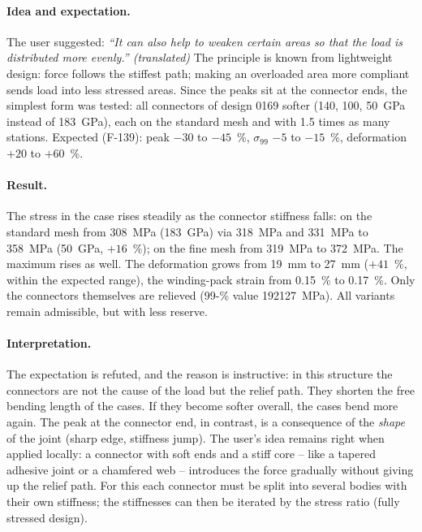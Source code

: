 \paragraph{Idea and expectation.} The user suggested: \emph{“It can also help to weaken certain areas so that the load
is distributed more evenly.” (translated)} The principle is known from lightweight design: force follows the stiffest
path; making an overloaded area more compliant sends load into less stressed areas. Since the peaks sit at the connector
ends, the simplest form was tested: all connectors of design 0169 softer (\SI{140}{}, \SI{100}{}, \SI{50}{GPa} instead
of \SI{183}{GPa}), each on the standard mesh and with 1.5 times as many stations. Expected (F-139): peak $-30$ to
$-45$~\%, $\sigma_{99}$ $-5$ to $-15$~\%, deformation $+20$ to $+60$~\%.

\begin{table}[H]\centering\scriptsize\caption{0169 with softer connectors. Numbers: 1xx
standard mesh, 2xx 1.5 times as many stations; original \SI{183}{GPa}: \SI{308}{MPa} and \SI{319}{MPa}.}\end{table}

\paragraph{Result.} The stress in the case rises steadily as the connector stiffness falls: on the standard mesh from
\SI{308}{MPa} (\SI{183}{GPa}) via \SI{318}{MPa} and \SI{331}{MPa} to \SI{358}{MPa} (\SI{50}{GPa}, $+16$~\%); on the fine
mesh from \SI{319}{MPa} to \SI{372}{MPa}. The maximum rises as well. The deformation grows from \SI{19}{mm} to
\SI{27}{mm} ($+41$~\%, within the expected range), the winding-pack strain from 0.15~\% to 0.17~\%. Only the connectors
themselves are relieved (99-\% value \SI{192}{\to}\SI{127}{MPa}). All variants remain admissible, but with less reserve.

\paragraph{Interpretation.} The expectation is refuted, and the reason is instructive: in this structure the connectors
are not the cause of the load but the relief path. They shorten the free bending length of the cases. If they become
softer overall, the cases bend more again. The peak at the connector end, in contrast, is a consequence of the
\emph{shape} of the joint (sharp edge, stiffness jump). The user's idea remains right when applied locally: a connector
with soft ends and a stiff core -- like a tapered adhesive joint or a chamfered web -- introduces the force gradually
without giving up the relief path. For this each connector must be split into several bodies with their own stiffness;
the stiffnesses can then be iterated by the stress ratio (fully stressed design).
